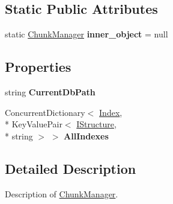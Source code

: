 \subsection*{Static Public Attributes}
\begin{DoxyCompactItemize}
\item 
\hypertarget{class_dwarf_d_b_1_1_chunk_manager_1_1_chunk_manager_a43d4aebedbb50fdfeb27840b3aa4849b}{static \hyperlink{class_dwarf_d_b_1_1_chunk_manager_1_1_chunk_manager}{Chunk\+Manager} {\bfseries inner\+\_\+object} = null}\label{class_dwarf_d_b_1_1_chunk_manager_1_1_chunk_manager_a43d4aebedbb50fdfeb27840b3aa4849b}

\end{DoxyCompactItemize}
\subsection*{Properties}
\begin{DoxyCompactItemize}
\item 
\hypertarget{class_dwarf_d_b_1_1_chunk_manager_1_1_chunk_manager_ab3d1c419f8c1c396ca43368f5f214614}{string {\bfseries Current\+Db\+Path}}\label{class_dwarf_d_b_1_1_chunk_manager_1_1_chunk_manager_ab3d1c419f8c1c396ca43368f5f214614}

\item 
\hypertarget{class_dwarf_d_b_1_1_chunk_manager_1_1_chunk_manager_aea31cf7ac0a6f0ec20ca7087d8898550}{Concurrent\+Dictionary$<$ \hyperlink{class_dwarf_d_b_1_1_data_structures_1_1_index}{Index}, \\*
Key\+Value\+Pair$<$ \hyperlink{interface_dwarf_d_b_1_1_data_structures_1_1_i_structure}{I\+Structure}, \\*
string $>$ $>$ {\bfseries All\+Indexes}}\label{class_dwarf_d_b_1_1_chunk_manager_1_1_chunk_manager_aea31cf7ac0a6f0ec20ca7087d8898550}

\end{DoxyCompactItemize}


\subsection{Detailed Description}
Description of \hyperlink{class_dwarf_d_b_1_1_chunk_manager_1_1_chunk_manager}{Chunk\+Manager}. 



